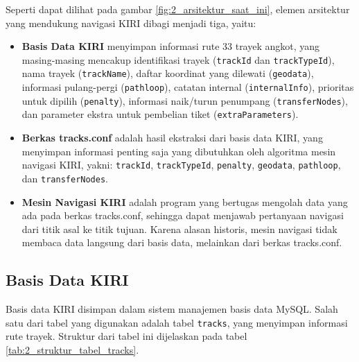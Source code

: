 Seperti dapat dilihat pada gambar \ref{fig:2_arsitektur_saat_ini}, elemen
arsitektur yang mendukung navigasi KIRI dibagi menjadi tiga, yaitu:
\begin{itemize}
	\item \textbf{Basis Data KIRI} menyimpan informasi rute 33 trayek angkot,
		yang masing-masing mencakup identifikasi trayek (\verb/trackId/ dan
		\verb/trackTypeId/), nama trayek (\verb/trackName/), daftar koordinat
		yang dilewati (\verb/geodata/), informasi pulang-pergi
		(\verb/pathloop/), catatan internal (\verb/internalInfo/), prioritas
		untuk dipilih (\verb/penalty/), informasi naik/turun penumpang
		(\verb/transferNodes/), dan parameter ekstra untuk pembelian
		tiket (\verb/extraParameters/).
	\item \textbf{Berkas tracks.conf} adalah hasil ekstraksi dari basis data
		KIRI, yang menyimpan informasi penting saja yang dibutuhkan oleh algoritma
		mesin navigasi KIRI, yakni: \verb/trackId/, \verb/trackTypeId/,
		\verb/penalty/, \verb/geodata/, \verb/pathloop/, dan
		\verb/transferNodes/.
	\item \textbf{Mesin Navigasi KIRI} adalah program yang bertugas mengolah
		data yang ada pada berkas tracks.conf, sehingga dapat menjawab
		pertanyaan navigasi dari titik asal ke titik tujuan. Karena alasan
		historis, mesin navigasi tidak membaca data langsung dari basis data,
		melainkan dari berkas tracks.conf.
\end{itemize}

\subsection{Basis Data KIRI}
Basis data KIRI disimpan dalam sistem manajemen basis data MySQL. Salah satu
dari tabel yang digunakan adalah tabel \verb/tracks/, yang menyimpan informasi
rute trayek. Struktur dari tabel ini dijelaskan pada tabel
\ref{tab:2_struktur_tabel_tracks}.

